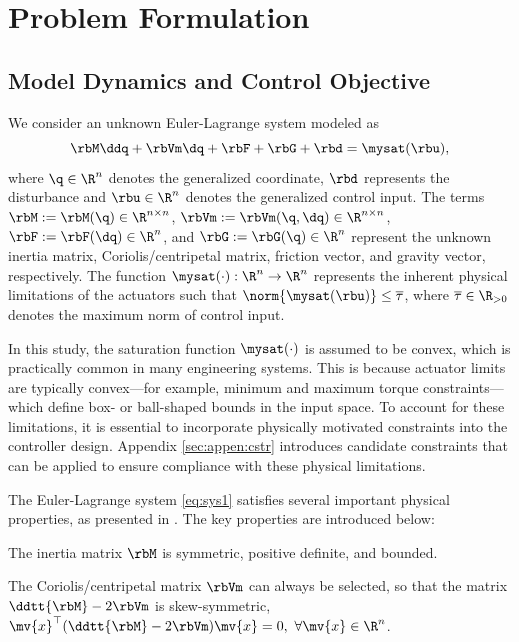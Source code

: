 \documentclass[letterpaper, journal]{IEEEtran}
\begin{document}
\section{Problem Formulation}\label{sec:Problem Formulation}

\subsection{Model Dynamics and Control Objective}

We consider an unknown Euler-Lagrange system modeled as
\begin{equation}
    \rbM\ddq +\rbVm \dq+ \rbF + \rbG + \rbd
    =
    \mysat(\rbu)
    ,
    \label{eq:sys1}
\end{equation}
where $\q\in \R^n$ denotes the generalized coordinate, $\rbd$ represents the disturbance and $\rbu\in\R^n$ denotes the generalized control input. 
The terms $\rbM:=\rbM(\q)\in\R^{n\times n}$, $\rbVm:=\rbVm(\q,\dq)\in\R^{n\times n}$, $\rbF:=\rbF(\dq)\in\R^{n}$, and $\rbG:=\rbG(\q)\in\R^{n}$ represent the unknown inertia matrix, Coriolis/centripetal matrix, friction vector, and gravity vector, respectively.
The function $\mysat(\cdot):\R^n\to\R^n$ represents the inherent physical limitations of the actuators such that $\norm{\mysat(\rbu)}\le \overline\tau$, where $\overline\tau\in\R_{>0}$ denotes the maximum norm of control input.

In this study, the saturation function $\mysat(\cdot)$ is assumed to be convex, which is practically common in many engineering systems.
This is because actuator limits are typically convex—for example, minimum and maximum torque constraints—which define box- or ball-shaped bounds in the input space.
To account for these limitations, it is essential to incorporate physically motivated constraints into the controller design.
Appendix \ref{sec:appen:cstr} introduces candidate constraints that can be applied to ensure compliance with these physical limitations.

The Euler-Lagrange system \eqref{eq:sys1} satisfies several important physical properties, as presented in \cite[Chap. 3, Tab. 3.2.1]{Lewis:1998aa}. 
The key properties are introduced below:
\begin{prop} 
    The inertia matrix $\rbM$ is symmetric, positive definite, and bounded.
    \label{prop:M}
\end{prop}

\begin{prop} 
    The Coriolis/centripetal matrix $\rbVm$ can always be selected, so that the matrix $\ddtt{\rbM}-2\rbVm$ is skew-symmetric, \ie $\mv{x}^\top(\ddtt{\rbM}-2\rbVm)\mv{x}=0,\ \forall \mv{x}\in\R^n$.
    \label{prop:skew}
\end{prop}
\end{document}
